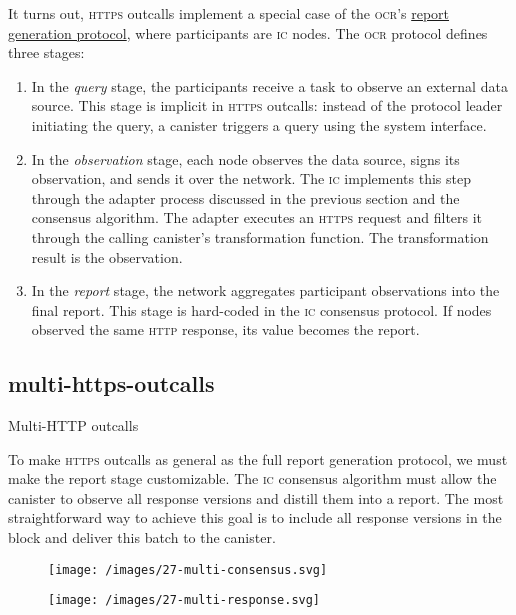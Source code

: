\documentclass{article}
\begin{document}
It turns out, \textsc{https} outcalls implement a special case of the \textsc{ocr}'s \href{/posts/24-ocr.html#report-generation}{report generation protocol}, where participants are \textsc{ic} nodes.
The \textsc{ocr} protocol defines three stages:
\begin{enumerate}
    \item
    In the \emph{query} stage, the participants receive a task to observe an external data source.
    This stage is implicit in \textsc{https} outcalls: instead of the protocol leader initiating the query, a canister triggers a query using the system interface.
    \item
    In the \emph{observation} stage, each node observes the data source, signs its observation, and sends it over the network.
    The \textsc{ic} implements this step through the adapter process discussed in the previous section and the consensus algorithm.
    The adapter executes an \textsc{https} request and filters it through the calling canister's transformation function.
    The transformation result is the observation.
    \item In the \emph{report} stage, the network aggregates participant observations into the final report.
    This stage is hard-coded in the \textsc{ic} consensus protocol.
    If  nodes observed the same \textsc{http} response, its value becomes the report.
\end{enumerate}

\subsection{multi-https-outcalls}{Multi-HTTP outcalls}

To make \textsc{https} outcalls as general as the full report generation protocol, we must make the report stage customizable.
The \textsc{ic} consensus algorithm must allow the canister to observe all response versions and distill them into a report.
The most straightforward way to achieve this goal is to include all response versions in the block and deliver this batch to the canister.

\begin{figure}[grayscale-diagram,p75]
\texttt{[image: /images/27-multi-consensus.svg]}
\end{figure}

\begin{figure}[grayscale-diagram,p75]
\texttt{[image: /images/27-multi-response.svg]}
\end{figure}
\end{document}
